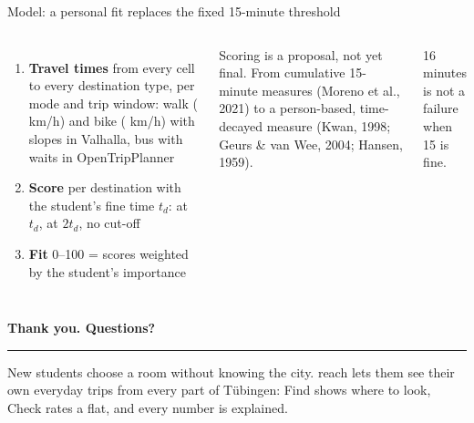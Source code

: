 \documentclass[aspectratio=169,10pt]{beamer}
\begin{document}
\begin{frame}{Model: a personal fit replaces the fixed 15-minute threshold}
  \begin{columns}[T,onlytextwidth]
      \begin{enumerate}\footnotesize
        \item \textbf{Travel times} from every cell to every destination type, per mode and
              trip window: walk (\factWalkKmh{} km/h) and bike (\factBikeKmh{} km/h) with slopes
              in Valhalla, bus with waits in OpenTripPlanner
        \item \textbf{Score} per destination with the student's fine time $t_d$:
              \factScoreAtFine{} at $t_d$, \factScoreAtDouble{} at $2t_d$, no cut-off
        \item \textbf{Fit} 0--100 = scores weighted by the student's importance
      \end{enumerate}
      \smallskip
      {\footnotesize\color{muted}Scoring is a proposal, not yet final. From cumulative
      15-minute measures (Moreno et al., 2021) to a person-based, time-decayed measure (Kwan,
      1998; Geurs \& van Wee, 2004; Hansen, 1959).\par}
      \centering
      \par
      {\tiny\color{muted}16 minutes is not a failure when 15 is fine.}
  \end{columns}
\end{frame}

{
\begin{frame}
  \vfill
  {\Large\bfseries Thank you. Questions?\par}
  \vskip4mm
  {\color{accent}\rule{25mm}{2pt}}\par\vskip4mm
  New students choose a room without knowing the city. reach lets them see their own everyday
  trips from every part of Tübingen: Find shows where to look, Check rates a flat, and every
  number is explained.\par
  \vfill
\end{frame}}
\end{document}
